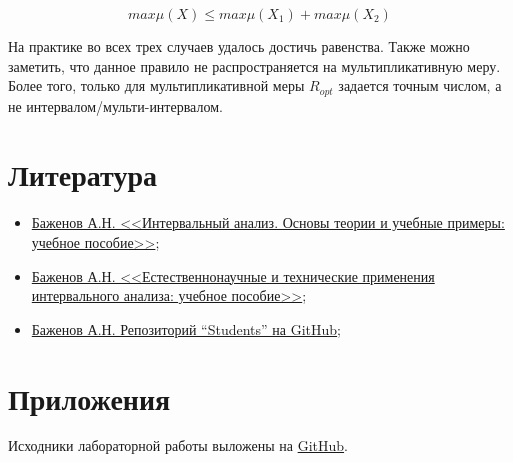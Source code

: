 \documentclass[a4paper,12pt]{article}
\begin{document}
\begin{equation}
  max\mu(X) \leq max\mu(X_1) + max\mu(X_2)
\end{equation}

На практике во всех трех случаев удалось достичь равенства. Также можно заметить, что
данное правило не распространяется на мультипликативную меру. Более того, только для
мультипликативной меры $ R_{opt} $ задается точным числом, а не интервалом/мульти-интервалом.

\section{Литература}
\begin{itemize}
  \item \href{https://elib.spbstu.ru/dl/2/s20-76.pdf/info}{Баженов А.Н.
    <<Интервальный анализ. Основы теории и учебные примеры: учебное пособие>>};
  \item \href{https://elib.spbstu.ru/dl/5/tr/2021/tr21-169.pdf/info}{Баженов
      А.Н. <<Естественнонаучные и технические применения интервального анализа:
    учебное пособие>>};
  \item \href{https://github.com/AlexanderBazhenov/Students}{Баженов А.Н.
    Репозиторий ``Students'' на GitHub};
\end{itemize}

\section{Приложения}
\quad Исходники лабораторной работы выложены на
\href{https://github.com/MeShootIn/interval-analysis/tree/lab-1}{GitHub}.
\end{document}
